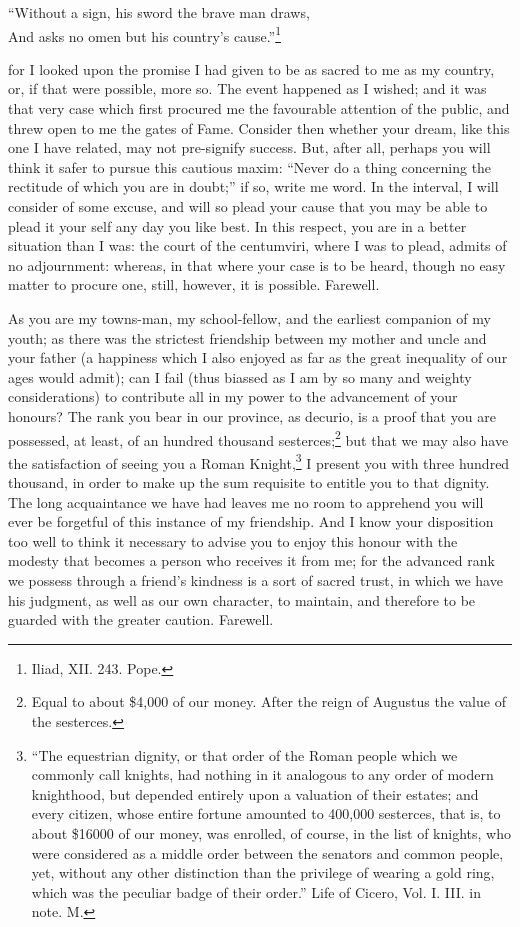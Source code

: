 ``Without a sign, his sword the brave man draws,\\
And asks no omen but his country's cause.''\footnote{Iliad, XII. 243. Pope.}

for I looked upon the promise I had given to be as sacred to me as my
country, or, if that were possible, more so. The event happened as I
wished; and it was that very case which first procured me the favourable
attention of the public, and threw open to me the gates of Fame. Consider
then whether your dream, like this one I have related, may not pre-signify
success. But, after all, perhaps you will think it safer to pursue this
cautious maxim: ``Never do a thing concerning the rectitude of which you
are in doubt;'' if so, write me word. In the interval, I will consider of
some excuse, and will so plead your cause that you may be able to plead it
your self any day you like best. In this respect, you are in a better
situation than I was: the court of the centumviri, where I was to plead,
admits of no adjournment: whereas, in that where your case is to be heard,
though no easy matter to procure one, still, however, it is possible.
Farewell.


As you are my towns-man, my school-fellow, and the earliest companion of
my youth; as there was the strictest friendship between my mother and
uncle and your father (a happiness which I also enjoyed as far as the
great inequality of our ages would admit); can I fail (thus biassed as I
am by so many and weighty considerations) to contribute all in my power to
the advancement of your honours? The rank you bear in our province, as
decurio, is a proof that you are possessed, at least, of an hundred
thousand sesterces;\footnote{Equal to about \$4,000 of
our money. After the reign of Augustus the value of the sesterces.} but that we may also have the satisfaction of
seeing you a Roman Knight,\footnote{``The equestrian dignity,
or that order of the Roman people which we commonly call knights, had
nothing in it analogous to any order of modern knighthood, but depended
entirely upon a valuation of their estates; and every citizen, whose
entire fortune amounted to 400,000 sesterces, that is, to about \$16000 of
our money, was enrolled, of course, in the list of knights, who were
considered as a middle order between the senators and common people, yet,
without any other distinction than the privilege of wearing a gold ring,
which was the peculiar badge of their order.'' Life of Cicero, Vol. I. III.
in note. M.} I present you with three hundred thousand, in
order to make up the sum requisite to entitle you to that dignity. The
long acquaintance we have had leaves me no room to apprehend you will ever
be forgetful of this instance of my friendship. And I know your
disposition too well to think it necessary to advise you to enjoy this
honour with the modesty that becomes a person who receives it from me; for
the advanced rank we possess through a friend's kindness is a sort of
sacred trust, in which we have his judgment, as well as our own character,
to maintain, and therefore to be guarded with the greater caution. Farewell.

